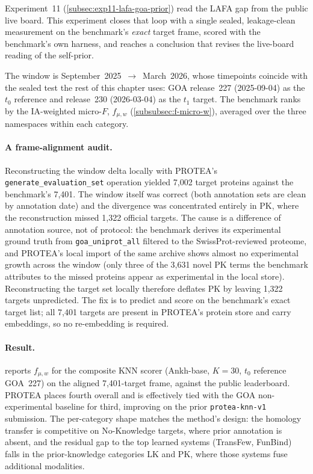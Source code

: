 Experiment~11 (\cref{subsec:exp11-lafa-goa-prior}) read the LAFA gap from the
public live board. This experiment closes that loop with a single sealed,
leakage-clean measurement on the benchmark's \emph{exact} target frame, scored
with the benchmark's own harness, and reaches a conclusion that revises the
live-board reading of the self-prior.

The window is September~2025~$\to$~March~2026, whose timepoints coincide with the
sealed test the rest of this chapter uses: GOA release~227 (2025-09-04) as the
$t_0$ reference and release~230 (2026-03-04) as the $t_1$ target. The benchmark
ranks by the IA-weighted micro-$F$, $f_{\mu,w}$ (\cref{subsubsec:f-micro-w}),
averaged over the three namespaces within each category.

\paragraph{A frame-alignment audit.}
Reconstructing the window delta locally with PROTEA's
\texttt{generate\_evaluation\_set} operation yielded 7{,}002 target proteins
against the benchmark's 7{,}401. The window itself was correct (both annotation
sets are clean by annotation date) and the divergence was concentrated entirely
in PK, where the reconstruction missed 1{,}322 official targets. The cause is a
difference of annotation source, not of protocol: the benchmark derives its
experimental ground truth from \texttt{goa\_uniprot\_all} filtered to the
SwissProt-reviewed proteome, and PROTEA's local import of the same archive shows
almost no experimental growth across the window (only three of the 3{,}631 novel
PK terms the benchmark attributes to the missed proteins appear as experimental
in the local store). Reconstructing the target set locally therefore deflates PK
by leaving 1{,}322 targets unpredicted. The fix is to predict and score on the
benchmark's exact target list; all 7{,}401 targets are present in PROTEA's protein
store and carry embeddings, so no re-embedding is required.

\paragraph{Result.}
 reports $f_{\mu,w}$ for the composite KNN scorer
(Ankh-base, $K{=}30$, $t_0$ reference GOA~227) on the aligned 7{,}401-target
frame, against the public leaderboard. PROTEA places fourth overall and is
effectively tied with the GOA non-experimental baseline for third, improving on
the prior \texttt{protea-knn-v1} submission. The per-category shape matches the
method's design: the homology transfer is competitive on No-Knowledge targets,
where prior annotation is absent, and the residual gap to the top learned systems
(TransFew, FunBind) falls in the prior-knowledge categories LK and PK, where those
systems fuse additional modalities.

